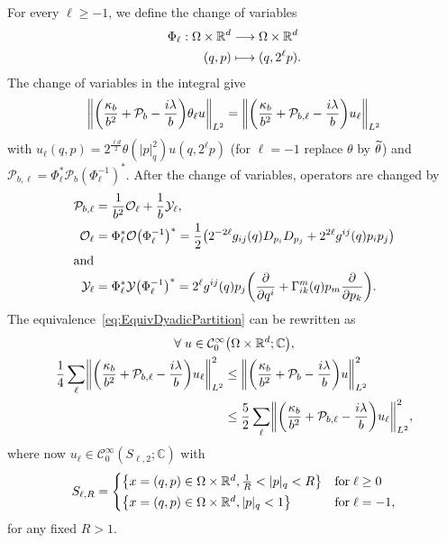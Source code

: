\documentclass[10pt]{amsart}
\theoremstyle{definition}\newtheorem{defi}[theo]{Definition}\newtheorem{rema}[theo]{Remark}\newtheorem{exam}[theo]{Example}\newtheorem{exem}[theo]{Example}\newtheorem{nota}[theo]{Notation}
\newcommand{\C}{\mathbb{C}}
\newcommand{\R}{\mathbb{R}}
\newcommand{\clC}{\mathcal{C}}
\newcommand{\clY}{\mathcal{Y}}
\newcommand{\clO}{\mathcal{O}}
\newcommand{\clP}{\mathcal{P}}
\let\oldtilde\tilde
\renewcommand*{\tilde}[1]{\mathchoice{\widetilde{#1}}{\widetilde{#1}}{\oldtilde{#1}}{\oldtilde{#1}}}
\let\oldforall\forall
\renewcommand*{\forall}{\mathrel{\oldforall}}
\let\originalleft\left
\let\originalright\right
\renewcommand{\left}{\mathopen{}\mathclose\bgroup\originalleft}
\renewcommand{\right}{\aftergroup\egroup\originalright}
\renewcommand*{\to}{\mathchoice{\longrightarrow}{\rightarrow}{\rightarrow}{\rightarrow}}
\let\oldmapsto\mapsto
\renewcommand*{\mapsto}{\mathchoice{\longmapsto}{\oldmapsto}{\oldmapsto}{\oldmapsto}}
\begin{document}
For every $\ell \geq -1$, we define the change of variables
\begin{align*}
\Phi_{\ell}:
\Omega\times\R^d &\to \Omega\times \R^d \\
(q,p) &\mapsto (q,2^{\ell}p).
\end{align*}
The change of variables in the integral give
\begin{equation}
\left\|\left(\frac{\kappa_{b}}{b^{2}}+\clP_{b}-\frac{i\lambda}{b}\right)\theta_{\ell}u\right\|_{L^2}=\left \| \left(\frac{\kappa_{b}}{b^{2}}+\clP_{b,\ell}-\frac{i\lambda}{b}\right)u_{\ell}\right\|_{L^2}
\end{equation}
with $ u_{\ell}(q,p) = 2^{\frac{\ell d}{2}}\theta(|p|^{2}_q)u(q,2^{\ell}p)$ (for $\ell=-1$ replace $\theta$ by $\tilde{\theta}$) and $\clP_{b,\ell}=\Phi_{\ell}^{*}\clP_{b}(\Phi_{\ell}^{-1})^{*}. $ After the change of variables, operators are changed by
\begin{align}
\clP_{b,\ell} &= \frac{1}{b^{2}} \clO_{\ell} + \frac{1}{b}\clY_{\ell}, \label{eq:defPbell}\\
\clO_{\ell} &=\Phi_{\ell}^{*}\clO\left(\Phi_{\ell}^{-1}\right)^{*} = \frac{1}{2}\left(2^{-2\ell}g_{ij}(q)D_{p_{i}}D_{p_{j}}+2^{2\ell}g^{ij}(q)p_{i}p_{j}\right)\label{eq:defOell}\\
\intertext{and}
\clY_{\ell} &= \Phi_{\ell}^{*}\clY\left(\Phi_{\ell}^{-1}\right)^{*}= 2^{\ell} g^{ij}(q) p_{j}\left(\frac{\partial}{\partial q^{i}} + \Gamma^{m}_{ik}(q)p_{m}\frac{\partial}{\partial p_{k}}\right).
\label{eq:defYell}
\end{align}
The equivalence~\eqref{eq:EquivDyadicPartition} can be rewritten as
\begin{multline}\label{eq:equivcalPbell}
\forall u\in \clC^{\infty}_{0}\left(\Omega \times \R^d;\C\right),\\
\begin{aligned}
\frac{1}{4} \sum_\ell \left\| \left(\frac{\kappa_b}{b^2} + \clP_{b,\ell} - \frac{i \lambda}{b}\right) u_{\ell}\right\|^2_{L^2} &\leq \left\|\left(\frac{\kappa_b}{b^2} + \clP_b - \frac{i \lambda}{b}\right) u \right\|^2_{L^2}\\
&\leq \frac{5}{2}\sum_\ell \left\| \left(\frac{\kappa_b}{b^2} + \clP_{b,\ell} - \frac{i \lambda}{b}\right) u_{\ell}\right\|^2_{L^2},
\end{aligned}
\end{multline}
where now $u_\ell\in \clC^{\infty}_{0}(S_{\ell,2};\C)$ with
\begin{equation}\label{eq:defSell}
S_{\ell,R}=
\begin{cases}
\left\{x=(q,p)\in\Omega\times\R^d, \frac{1}{R}< |p|_q <R
\right\}&\text{for}\;\ell\geq 0\\[0.20em]
\left\{x=(q,p)\in\Omega\times \R^d, |p|_q< 1\right\}&\text{for}\;\ell=-1,
\end{cases}
\end{equation}
for any fixed $R>1$.
\end{document}
